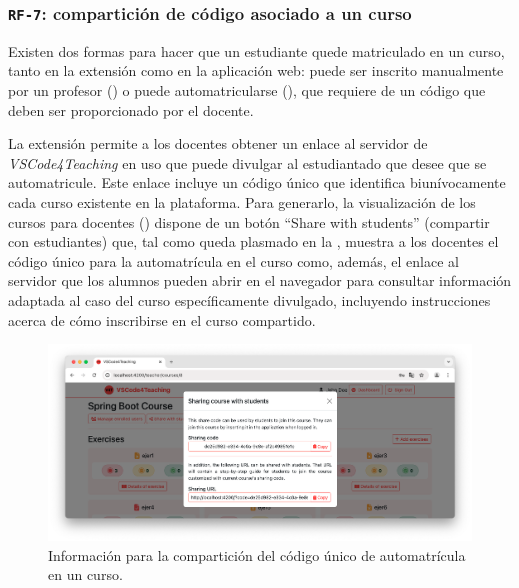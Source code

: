 \subsubsection{\texttt{RF-7}: compartición de código asociado a un curso}
\label{subsec:rf7}

Existen dos formas para hacer que un estudiante quede matriculado en un curso, tanto en la extensión como en la aplicación web: puede ser inscrito manualmente por un profesor () o puede automatricularse (), que requiere de un código que deben ser proporcionado por el docente.

La extensión permite a los docentes obtener un enlace al servidor de \textit{VSCode4Teaching} en uso que puede divulgar al estudiantado que desee que se automatricule. Este enlace incluye un código único que identifica biunívocamente cada curso existente en la plataforma. Para generarlo, la visualización de los cursos para docentes () dispone de un botón ``Share with students'' (compartir con estudiantes) que, tal como queda plasmado en la , muestra a los docentes el código único para la automatrícula en el curso como, además, el enlace al servidor que los alumnos pueden abrir en el navegador para consultar información adaptada al caso del curso específicamente divulgado, incluyendo instrucciones acerca de cómo inscribirse en el curso compartido.

\begin{figure}[ht]
    \centering
    \includegraphics[width=\textwidth]{imagenes/utilizadas/4-3-implementacion/rf7-1.png}
    \caption{Información para la compartición del código único de automatrícula en un curso.}
    \label{fig:reqf7-1}
\end{figure}
